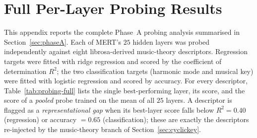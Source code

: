 \documentclass[12pt]{report}
\begin{document}
\appendix

\chapter{Full Per-Layer Probing Results}
\label{app:probing}

This appendix reports the complete Phase~A probing analysis summarised in Section~\ref{sec:phaseA}. Each of MERT's $25$ hidden layers was probed independently against eight librosa-derived music-theory descriptors. Regression targets were fitted with ridge regression and scored by the coefficient of determination $R^{2}$; the two classification targets (harmonic mode and musical key) were fitted with logistic regression and scored by accuracy. For every descriptor, Table~\ref{tab:probing-full} lists the single best-performing layer, its score, and the score of a \emph{pooled} probe trained on the mean of all $25$ layers. A descriptor is flagged as a \emph{representational gap} when its best-layer score falls below $R^{2}=0.40$ (regression) or accuracy $=0.65$ (classification); these are exactly the descriptors re-injected by the music-theory branch of Section~\ref{sec:cyclickey}.
\end{document}
